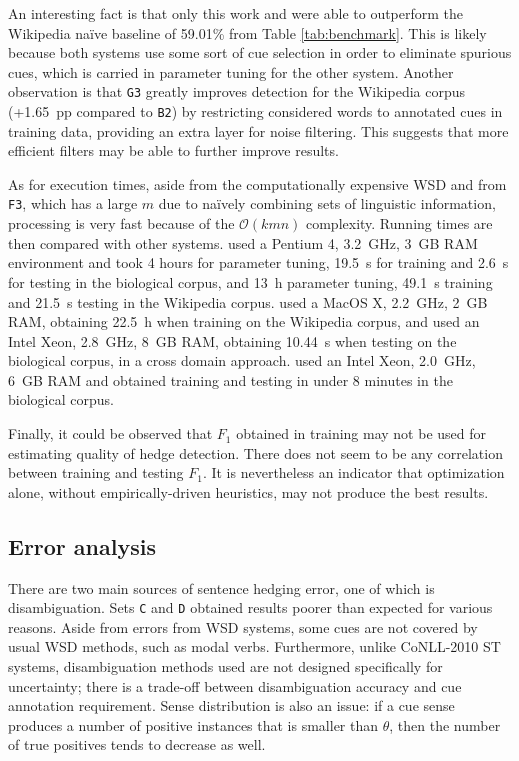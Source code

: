 \documentclass[english]{jnlp_1.4}
\begin{document}
An interesting fact is that only this work and  were able to outperform the Wikipedia na\"{i}ve baseline of 59.01\% from Table \ref{tab:benchmark}. This is likely because both systems use some sort of cue selection in order to eliminate spurious cues, which is carried in parameter tuning for the other system. Another observation is that \texttt{G3} greatly improves detection for the Wikipedia corpus (+1.65~pp compared to \texttt{B2}) by restricting considered words to annotated cues in training data, providing an extra layer for noise filtering. This suggests that more efficient filters may be able to further improve results.

As for execution times, aside from the computationally expensive WSD and from \texttt{F3}, which has a large $m$ due to na\"{i}vely combining sets of linguistic information, processing is very fast because of the $\mathcal{O}(kmn)$ complexity. Running times are then compared with other systems.  used a Pentium 4, 3.2~GHz, 3~GB RAM environment and took 4 hours for parameter tuning, 19.5~s for training and 2.6~s for testing in the biological corpus, and 13~h parameter tuning, 49.1~s training and 21.5~s testing in the Wikipedia corpus.  used a MacOS X, 2.2~GHz, 2~GB RAM, obtaining 22.5~h when training on the Wikipedia corpus, and used an Intel Xeon, 2.8~GHz, 8~GB RAM, obtaining 10.44~s when testing on the biological corpus, in a cross domain approach.  used an Intel Xeon, 2.0~GHz, 6~GB RAM and obtained training and testing 
in under 8 minutes in the biological corpus.

Finally, it could be observed that $F_1$ obtained in training may not be used for estimating quality of hedge detection. There does not seem to be any correlation between training and testing $F_1$. It is nevertheless an indicator that optimization alone, without empirically-driven heuristics, may not produce the best results.


\subsection{Error analysis}

There are two main sources of sentence hedging error, one of which is disambiguation. Sets \texttt{C} and \texttt{D} obtained results poorer than expected for various reasons. Aside from errors from WSD systems, some cues are not covered by usual WSD methods, such as modal verbs. Furthermore, unlike CoNLL-2010 ST systems, disambiguation methods used are not designed specifically for uncertainty; there is a trade-off between disambiguation accuracy and cue annotation requirement. Sense distribution is also an issue: if a cue sense produces a number of positive instances that is smaller than $\theta$, then the number of true positives tends to decrease as well.
\end{document}
